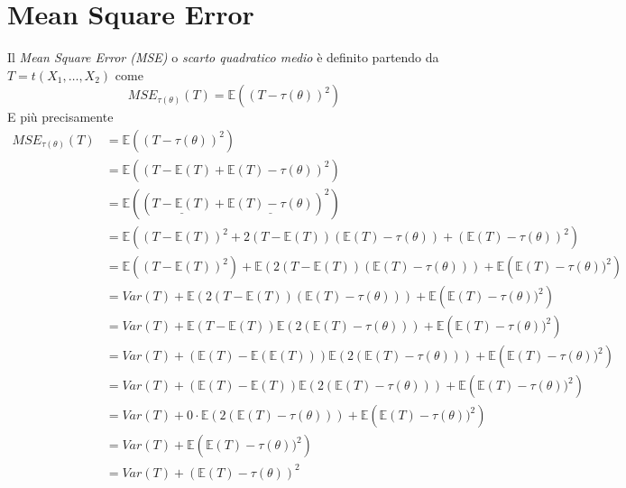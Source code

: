 \documentclass[11pt]{report}
\begin{document}
\section{Mean Square Error}
Il \textit{Mean Square Error (MSE)} o \textit{scarto quadratico medio} è definito partendo da $T = t(X_1, \dots, X_2)$ come
\begin{equation}
	MSE_{\tau(\theta)}(T) = \mathbb{E} \left( (T - \tau(\theta))^2 \right)
\end{equation}
E più precisamente
\begin{equation}
    \begin{split}
        MSE_{\tau(\theta)}(T) & = \mathbb{E} \left( (T - \tau(\theta))^2 \right)\\
        & = \mathbb{E} \left( (T - \mathbb{E}(T) + \mathbb{E}(T) - \tau(\theta))^2 \right)\\
        & = \mathbb{E} \left( (\underline{T - \mathbb{E}(T)} + \underline{\mathbb{E}(T) - \tau(\theta)})^2 \right)\\
        & = \mathbb{E} \left( (T - \mathbb{E}(T))^2 + 2(T - \mathbb{E}(T))(\mathbb{E}(T) - \tau(\theta)) + (\mathbb{E}(T) - \tau(\theta))^2 \right)\\
        & = \mathbb{E} \left( (T - \mathbb{E}(T))^2 \right) + \mathbb{E}(2(T - \mathbb{E}(T))(\mathbb{E}(T) - \tau(\theta))) + \mathbb{E} \left( \mathbb{E}(T) - \tau(\theta))^2 \right)\\
        & = Var(T) + \mathbb{E}(2(T - \mathbb{E}(T))(\mathbb{E}(T) - \tau(\theta))) + \mathbb{E} \left( \mathbb{E}(T) - \tau(\theta))^2 \right)\\
        & = Var(T) + \mathbb{E}(T - \mathbb{E}(T))\mathbb{E}(2(\mathbb{E}(T) - \tau(\theta))) + \mathbb{E} \left( \mathbb{E}(T) - \tau(\theta))^2 \right)\\
        & = Var(T) + (\mathbb{E}(T) - \mathbb{E}(\mathbb{E}(T))) \mathbb{E}(2(\mathbb{E}(T) - \tau(\theta))) + \mathbb{E} \left( \mathbb{E}(T) - \tau(\theta))^2 \right)\\
        & = Var(T) + (\mathbb{E}(T) - \mathbb{E}(T)) \mathbb{E}(2(\mathbb{E}(T) - \tau(\theta))) + \mathbb{E} \left( \mathbb{E}(T) - \tau(\theta))^2 \right)\\
        & = Var(T) + 0 \cdot \mathbb{E}(2(\mathbb{E}(T) - \tau(\theta))) + \mathbb{E} \left( \mathbb{E}(T) - \tau(\theta))^2 \right)\\
        & = Var(T) + \mathbb{E} \left( \mathbb{E}(T) - \tau(\theta))^2 \right)\\
        & = Var(T) + (\mathbb{E}(T) - \tau(\theta))^2
    \end{split}
\end{equation}
\end{document}
